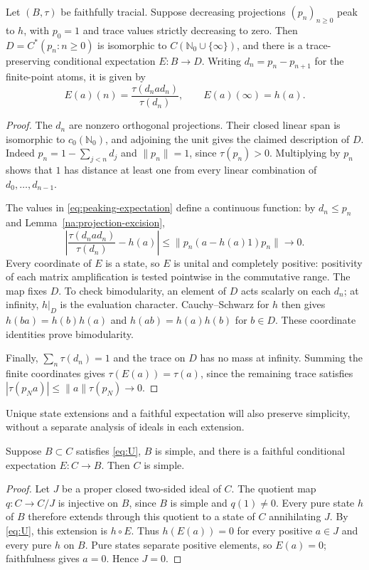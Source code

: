 \begin{lemma}\label{na:peaking-expectation}
Let $(B,\tau)$ be faithfully tracial.  Suppose decreasing projections
$(p_n)_{n\ge0}$ peak to $h$, with $p_0=1$ and trace values strictly
decreasing to zero.  Then
$D=C^*(p_n:n\ge0)$ is isomorphic to
$C(\mathbb N_0\cup\{\infty\})$, and there is a trace-preserving conditional
expectation $E:B\to D$.  Writing $d_n=p_n-p_{n+1}$ for the finite-point
atoms, it is given by
\begin{equation}\label{eq:peaking-expectation}
 E(a)(n)=\frac{\tau(d_nad_n)}{\tau(d_n)},\qquad E(a)(\infty)=h(a).
\end{equation}
\end{lemma}
\begin{proof}
The $d_n$ are nonzero orthogonal projections.  Their closed linear span is
isomorphic to $c_0(\mathbb N_0)$, and adjoining the unit gives the claimed
description of $D$.  Indeed $p_n=1-\sum_{j<n}d_j$ and $\|p_n\|=1$,
since $\tau(p_n)>0$.  Multiplying by $p_n$ shows that $1$ has distance
at least one from every linear combination of $d_0,\ldots,d_{n-1}$.

The values in \eqref{eq:peaking-expectation} define a continuous function:
by $d_n\le p_n$ and Lemma~\ref{na:projection-excision},
\[
 \left|\frac{\tau(d_nad_n)}{\tau(d_n)}-h(a)\right|
 \le \|p_n(a-h(a)1)p_n\|\longrightarrow0.
\]
Every coordinate of $E$ is a state, so $E$ is unital and completely
positive: positivity of each matrix amplification is tested pointwise
in the commutative range.  The map fixes $D$.  To check bimodularity,
an element of $D$ acts scalarly on each $d_n$; at infinity, $h|_D$ is the
evaluation character.  Cauchy--Schwarz for $h$ then gives
$h(ba)=h(b)h(a)$ and $h(ab)=h(a)h(b)$ for $b\in D$.
These coordinate identities prove bimodularity.

Finally, $\sum_n\tau(d_n)=1$ and the trace on $D$ has no mass at infinity.
Summing the finite coordinates gives $\tau(E(a))=\tau(a)$, since the
remaining trace satisfies
$|\tau(p_Na)|\le\|a\|\tau(p_N)\to0$.
\end{proof}

Unique state extensions and a faithful expectation will also preserve
simplicity, without a separate analysis of ideals in each extension.

\begin{lemma}\label{na:simple-extension}
Suppose $B\subset C$ satisfies \eqref{eq:U}, $B$ is simple, and there is a
faithful conditional expectation $E:C\to B$.  Then $C$ is simple.
\end{lemma}
\begin{proof}
Let $J$ be a proper closed two-sided ideal of $C$.  The quotient map
$q:C\to C/J$ is injective on $B$, since $B$ is simple and $q(1)\ne0$.
Every pure state $h$ of $B$ therefore extends through this quotient to a
state of $C$ annihilating $J$.  By \eqref{eq:U}, this extension is $h\circ E$.
Thus $h(E(a))=0$ for every positive $a\in J$ and every pure $h$ on $B$.
Pure states separate positive elements, so $E(a)=0$; faithfulness gives
$a=0$.  Hence $J=0$.
\end{proof}
